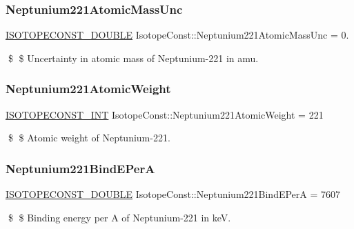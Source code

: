 \subsubsection{\texorpdfstring{Neptunium221\+Atomic\+Mass\+Unc}{Neptunium221AtomicMassUnc}}
{\footnotesize\ttfamily \mbox{\hyperlink{group___isotope_const-_macros_ga8f45a7272ce02c0b4c65c44636ed719a}{I\+S\+O\+T\+O\+P\+E\+C\+O\+N\+S\+T\+\_\+\+D\+O\+U\+B\+LE}} Isotope\+Const\+::\+Neptunium221\+Atomic\+Mass\+Unc = 0.}

\$ \$ Uncertainty in atomic mass of Neptunium-\/221 in amu. \mbox{\label{group___isotope_const-_neptunium-_np221_gad35d6800625446930ee0b184c4b99069}} 
\subsubsection{\texorpdfstring{Neptunium221\+Atomic\+Weight}{Neptunium221AtomicWeight}}
{\footnotesize\ttfamily \mbox{\hyperlink{group___isotope_const-_macros_ga5f18360b3e99483a35c32d789e62621c}{I\+S\+O\+T\+O\+P\+E\+C\+O\+N\+S\+T\+\_\+\+I\+NT}} Isotope\+Const\+::\+Neptunium221\+Atomic\+Weight = 221}

\$ \$ Atomic weight of Neptunium-\/221. \mbox{\label{group___isotope_const-_neptunium-_np221_ga43645b9575d0b6c02438fad44073bf08}} 
\subsubsection{\texorpdfstring{Neptunium221\+Bind\+E\+PerA}{Neptunium221BindEPerA}}
{\footnotesize\ttfamily \mbox{\hyperlink{group___isotope_const-_macros_ga8f45a7272ce02c0b4c65c44636ed719a}{I\+S\+O\+T\+O\+P\+E\+C\+O\+N\+S\+T\+\_\+\+D\+O\+U\+B\+LE}} Isotope\+Const\+::\+Neptunium221\+Bind\+E\+PerA = 7607}

\$ \$ Binding energy per A of Neptunium-\/221 in keV. \mbox{\label{group___isotope_const-_neptunium-_np221_gaf384a45ec324c887c5a69ff3fa0ea58e}} 
